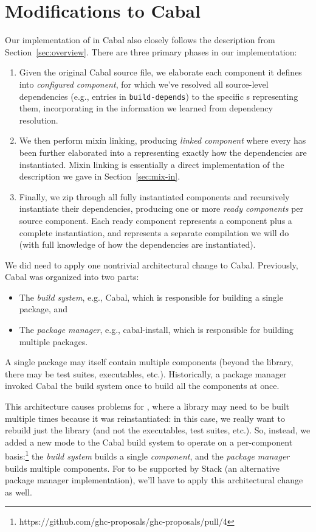 \section{Modifications to Cabal}

Our implementation of \Backpack{} in Cabal also closely follows the description
from Section~\ref{sec:overview}.  There are three primary phases in our
implementation:

\begin{enumerate}
    \item Given the original Cabal source file, we elaborate each
    component it defines into \emph{configured component},
    for which we've resolved all source-level dependencies
    (e.g., entries in \verb|build-depends|) to the specific
    \cid{}s representing them, incorporating in the information
    we learned from dependency resolution.

    \item We then perform mixin linking, producing \emph{linked component}
    where every \cid{} has been further elaborated into a \uid{}
    representing exactly how the dependencies are instantiated.
    Mixin linking is essentially a direct implementation of the
    description we gave in Section~\ref{sec:mix-in}.

    \item Finally, we zip through all fully instantiated components
    and recursively instantiate their dependencies, producing one or
    more \emph{ready components} per source component.  Each ready
    component represents a component plus a complete instantiation,
    and represents a separate compilation we will do (with full
    knowledge of how the dependencies are instantiated).
\end{enumerate}
%
We did need to apply one nontrivial architectural change to Cabal.
Previously, Cabal was organized into two parts:

\begin{itemize}
    \item The \emph{build system}, e.g., Cabal, which is responsible for
    building a single package, and

    \item The \emph{package manager}, e.g., cabal-install, which is
    responsible for building multiple packages.
\end{itemize}
%
A single package may itself contain multiple components (beyond the library,
there may be test suites, executables, etc.). Historically, a package manager
invoked Cabal the build system once to build all the components at once.

This architecture causes problems for \Backpack, where a library may need
to be built multiple times because it was reinstantiated: in this case, we really want to
rebuild just the library (and not the executables, test suites, etc.).
So, instead, we added a new mode to the Cabal build system to operate
on a per-component basis:\footnote{https://github.com/ghc-proposals/ghc-proposals/pull/4}
the \emph{build system} builds a single \emph{component}, and
the \emph{package manager} builds multiple components.  For \Backpack{} to be
supported by Stack (an alternative package manager implementation), we'll have
to apply this architectural change as well.
